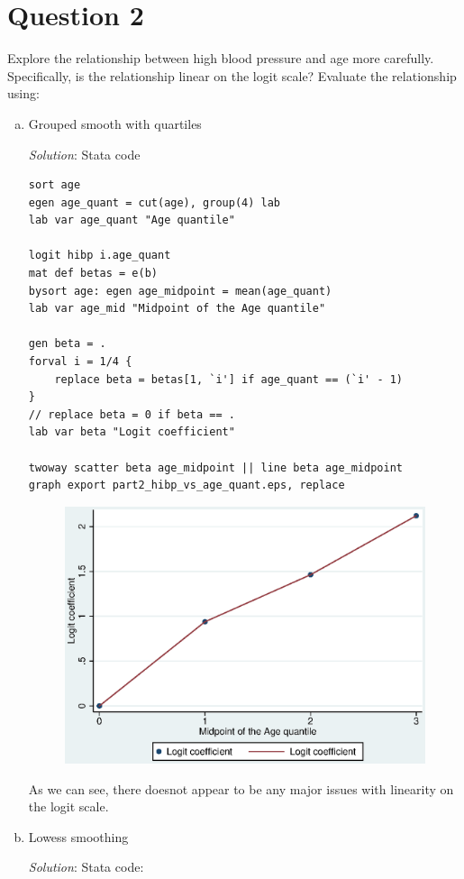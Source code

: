 \documentclass{article}
\begin{document}
\section{Question 2} 
  Explore the relationship between high blood pressure and age more carefully.  Specifically, is the relationship linear on the logit scale?  Evaluate the relationship using:
\begin{enumerate}[a.]
    \item  Grouped smooth with quartiles 
    
    \textit{Solution}: Stata code
    
\begin{verbatim}
sort age
egen age_quant = cut(age), group(4) lab
lab var age_quant "Age quantile"

logit hibp i.age_quant
mat def betas = e(b)
bysort age: egen age_midpoint = mean(age_quant)
lab var age_mid "Midpoint of the Age quantile"

gen beta = .
forval i = 1/4 {
    replace beta = betas[1, `i'] if age_quant == (`i' - 1)
}
// replace beta = 0 if beta == .
lab var beta "Logit coefficient"

twoway scatter beta age_midpoint || line beta age_midpoint
graph export part2_hibp_vs_age_quant.eps, replace
\end{verbatim}
    
    \begin{figure}[!h]
        \centering
        \includegraphics[width=.7\linewidth]{04/part2_hibp_vs_age_quant.eps}
    \end{figure}
    
As we can see, there doesnot appear to be any major issues with linearity on the logit scale.
    
    \item Lowess smoothing
    
    \textit{Solution}: Stata code:
    

\end{enumerate}
\end{document}
